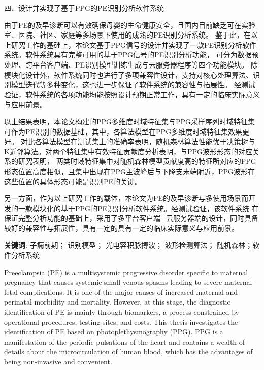 四、设计并实现了基于PPG的PE识别分析软件系统

由于PE的及早诊断可以有效确保母婴的生命健康安全，且国内目前缺乏可在实验室、医院、社区、家庭等多场景下使用的成熟的PE识别分析系统。
鉴于此，在以上研究工作的基础上，本论文基于PPG信号的设计并实现了一款PE识别分析软件系统。软件系统具有完整可用的基于PPG信号的PE识别分析功能，
可分为数据预处理、跨平台客户端、PE识别模型训练生成与云服务器程序等四个功能模块。
除模块化设计外，软件系统同时也进行了多项兼容性设计，支持对核心处理算法、识别模型迭代等多种变化，这也进一步保证了软件系统的兼容性与拓展性。
经测试验证，软件系统的各项功能均能按照设计预期正常工作，具有一定的临床实际意义与应用前景。

以上结果表明，本论文构建的PPG多维度时域特征集与PPG采样序列时域特征集可作为PE识别的数据基础，其中，各算法模型在PPG多维度时域特征集效果更好。
对比各算法模型在测试集上的准确率表明，随机森林算法性能优于决策树与K近邻算法。对两个特征集中有效特征贡献度分析表明，与PPG波形形态的对应关系的研究表明，
两类时域特征集中对随机森林模型贡献度高的特征所对应的PPG形态位置高度相似，且集中出现在PPG主波峰后与下降支末端附近，PPG波形在这些位置的具体形态可能是识别PE的关键。

另一方面，作为以上研究工作的载体，本论文为PE的及早诊断与多使用场景而开发的一款模块化的基于PPG的PE识别分析软件系统。经测试验证，该软件系统
在保证完整分析功能的基础上，采用了多平台客户端+云服务器端的设计，同时具备较好的兼容性与拓展性，具有一定的具有一定的临床实际意义与应用前景。

\vspace{2em}

\textbf{关键词}: 子痫前期； 识别模型； 光电容积脉搏波； 波形检测算法； 随机森林；软件分析系统


\cleardoublepage
{}

Preeclampsia (PE) is a multisystemic progressive disorder specific to maternal pregnancy that causes systemic small venous spasms 
leading to severe maternal-fetal complications. It is one of the major causes of increased maternal and perinatal morbidity and mortality.  
However, at this stage, the diagnostic identification of PE is mainly through biomarkers, a process constrained by operational procedures, 
testing sites, and costs. 
This thesis investigates the identification of PE based on photoplethysmography (PPG). PPG is a manifestation of the periodic pulsations 
of the heart and contains a wealth of details about the microcirculation of human blood, which has the advantages of being non-invasive and convenient.

